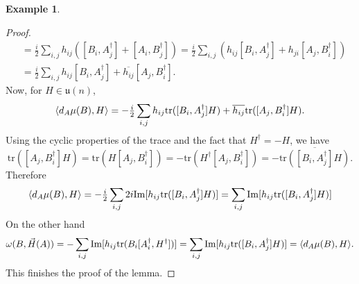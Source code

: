 \documentclass[12pt,a4paper]{book}
\theoremstyle{definition} \newtheorem{defn}[thm]{Definition}
\theoremstyle{definition} \newtheorem{ejemplo}[thm]{Example}
\theoremstyle{remark} \newtheorem{rem}[thm]{Remark}
\def\tr{\mathrm{tr}}
\def\uu{\mathfrak{u}}
\DeclarePairedDelimiter\esc{\langle}{\rangle}
\begin{document}
\begin{ejemplo}
\begin{proof}
\begin{align*}
	&= \tfrac{i}{2}\sum_{i,j} h_{ij} ([B_i,A_j^\dagger]+[A_i,B_j^\dagger]) = \tfrac{i}{2}\sum_{i,j} (h_{ij} [B_i,A_j^\dagger]+ h_{ji}[A_j,B_i^\dagger]) \\
	&= \tfrac{i}{2} \sum_{i,j} h_{ij} [B_i,A_j^\dagger]+ \overline{h_{ij}}[A_j,B_i^\dagger].
      \end{align*}
      Now, for $H\in \uu(n)$,
      \begin{equation*}
	\esc{d_A\mu(B),H}=-\tfrac{i}{2} \sum_{i,j} h_{ij} \tr([B_i,A_j^\dagger]H)+ \overline{h_{ij}}\tr([A_j,B_i^\dagger]H).
      \end{equation*}
      Using the cyclic properties of the trace and the fact that $H^\dagger=-H$, we have
      \begin{equation*}
\tr(	[A_j,B_i^\dagger]H)=\tr(H[A_j,B_i^\dagger])=-\tr(H^\dagger[A_j,B_i^\dagger])=-\overline{\tr([B_i,A_j^\dagger]H)}.
      \end{equation*}
      Therefore
      \begin{equation*}
	\esc{d_A\mu(B),H} =- \tfrac{i}{2} \sum_{i,j} 2i \mathrm{Im}[h_{ij}\tr([B_i,A_j^\dagger]H)]= \sum_{i,j} \mathrm{Im}[h_{ij}\tr([B_i,A_j^\dagger]H)]
      \end{equation*}
On the other hand
\begin{equation*}
  \omega(B,\vec{H}(A))=-\sum_{i,j}\mathrm{Im}[h_{ij} \tr(B_i [A_i^\dagger,H^\dagger])]=\sum_{i,j}\mathrm{Im}[h_{ij} \tr([B_i,A_j^\dagger]H)]=\esc{d_A\mu(B),H}.
\end{equation*}
This finishes the proof of the lemma.
    \end{proof}
    \end{ejemplo}
\end{document}
